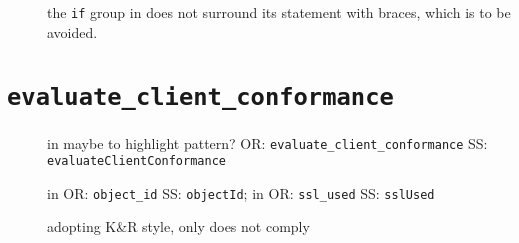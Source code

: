 
\begin{description}
		
	\item [] 
		the \verb|if| group in  does not surround its statement with braces, which is to be avoided. 

\end{description}

	












































\section{\normalfont\texttt{evaluate\_client\_conformance}}
\begin{description}
	
	\item [] 
		in  maybe to highlight pattern? 
			OR: \texttt{evaluate\_client\_conformance}
			SS: \texttt{evaluateClientConformance}
	
	\item [] 
		in  
			OR: \texttt{object\_id}
			SS: \texttt{objectId}; 
		in  
			OR: \texttt{ssl\_used}
			SS: \texttt{sslUsed}
	
		
	\item []
		adopting K\&R style, only  does not comply
	
\end{description}


